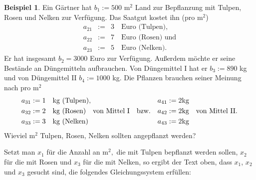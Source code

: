 \documentclass[a4paper,11pt,oneside]{article}
\theoremstyle{definition}
\newtheorem{example}{Beispiel}
\begin{document}
\begin{example}\label{Bsp:RosenNelken}
Ein Gärtner hat $b_1:=500$ m$^2$ Land zur Bepflanzung mit Tulpen, Rosen und Nelken zur Verfügung. Das Saatgut kostet ihn (pro m$^2$)
\begin{eqnarray*}
a_{21}&:=&3\quad \text{Euro (Tulpen)},\\
a_{22}&:=&7\quad \text{Euro (Rosen) und}\\
a_{23}&:=&5\quad \text{Euro (Nelken).}
\end{eqnarray*}
Er hat insgesamt $b_2=3000$ Euro zur Verfügung. Außerdem möchte er seine Bestände an Düngemitteln aufbrauchen. Von Düngemittel I hat er $b_3:=890$ kg und von Düngemittel II $b_4:=1000$ kg. Die Pflanzen brauchen seiner Meinung nach pro m$^2$
\begin{equation*}
\begin{alignedat}{3}
a_{31}&:=1\quad\text{kg (Tulpen),}&a_{41}&:=2&&\text{kg}\\
a_{32}&:=2\quad\text{kg (Rosen)\quad von Mittel I\quad bzw.\quad }&a_{42}&:=2&&\text{kg\quad von Mittel II.}\\
a_{33}&:=3 \quad\text{kg (Nelken)}&a_{43}&:=2&&\text{kg}
\end{alignedat}
\end{equation*}
Wieviel m$^2$ Tulpen, Rosen, Nelken sollten angepflanzt werden?

Setzt man $x_1$ für die Anzahl an m$^2,$ die mit Tulpen bepflanzt werden sollen, $x_2$ für die mit Rosen und $x_3$ für die mit Nelken, so ergibt der Text oben, dass $x_1$, $x_2$ und $x_3$ gesucht sind, die folgendes Gleichungssystem erfüllen:


\end{example}
\end{document}
